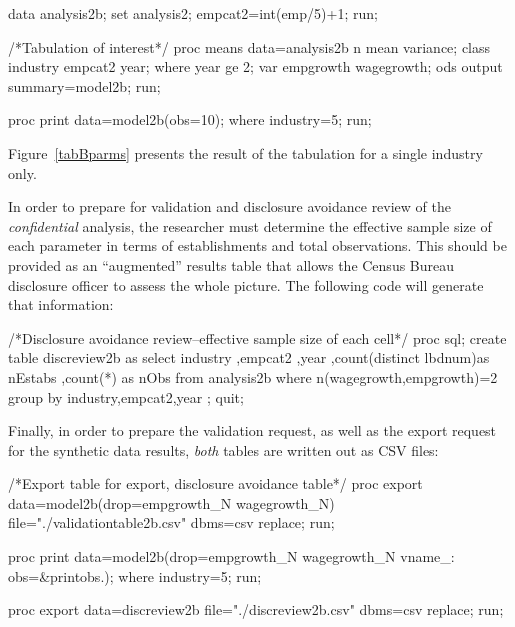 \documentclass{article}
\begin{document}
\begin{Datastep}
data analysis2b;
	set analysis2;
	empcat2=int(emp/5)+1;
run;
\end{Datastep}

\begin{Sascode}[store=tabB]
/*Tabulation of interest*/
proc means data=analysis2b n mean variance;
class industry empcat2 year;
where year ge 2;
var empgrowth wagegrowth;
ods output summary=model2b;
run;

proc print data=model2b(obs=10);
where industry=5;
run;
\end{Sascode}
Figure~\ref{tabBparms} presents the result of the tabulation for a single industry only.


In order to prepare for validation and disclosure avoidance review of the \textit{confidential} analysis, the researcher must determine  the effective sample size of each parameter in terms of establishments and total observations. This should be provided as an ``augmented'' results table that allows the Census Bureau disclosure officer to assess the whole picture. The following code will generate that information:

\begin{Datastep}
/*Disclosure avoidance review--effective sample size of each cell*/
proc sql;
create table discreview2b as
select industry
      ,empcat2
      ,year
      ,count(distinct lbdnum)as nEstabs
      ,count(*) as nObs
from analysis2b
where n(wagegrowth,empgrowth)=2
group by industry,empcat2,year
;
quit;
\end{Datastep}

Finally, in order to prepare the validation request, as well as the export request for the synthetic data results, \textit{both} tables are written out as CSV files:
\begin{Datastep}
/*Export table for export, disclosure avoidance table*/
proc export data=model2b(drop=empgrowth_N wagegrowth_N) 
 file="./validationtable2b.csv" dbms=csv replace;
run;
\end{Datastep}

\begin{Sascode}[store=paramBcsv,program]
proc print data=model2b(drop=empgrowth_N wagegrowth_N vname_: obs=&printobs.);
where industry=5;
run;
\end{Sascode}

\begin{Datastep}
proc export data=discreview2b 
  file="./discreview2b.csv" dbms=csv replace;
run;
\end{Datastep}
\end{document}
